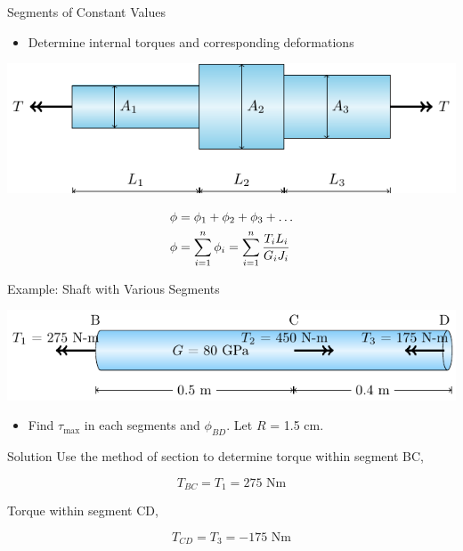 \documentclass[10pt, svgnames]{beamer}
\begin{document}
\begin{frame}[label={sec:org815ceec}]{Segments of Constant Values}
\begin{itemize}
\item Determine internal torques and corresponding deformations
\end{itemize}

\begin{center}
\includegraphics[width=.9\linewidth]{pictures/segments-constant-values.pdf}
\end{center}

\begin{gather*}
  \phi  = {\phi _1} + {\phi _2} + {\phi _3} +  \ldots  \hfill \\
  \phi  = \sum\limits_{i = 1}^n {{\phi _i} = \sum\limits_{i = 1}^n \dfrac{T_iL_i}{G_i J_i} }  \hfill \\
\end{gather*}
\end{frame}

\begin{frame}[label={sec:orgdd4ff51}]{Example: Shaft with Various Segments}
\begin{center}
\includegraphics[width=.9\linewidth]{pictures/segments-example.pdf}
\end{center}

\begin{itemize}
\item Find \(\tau_{\max}\) in each segments and \(\phi_{BD}\). Let \(R\) =
1.5 cm.
\end{itemize}
\end{frame}

\begin{frame}[label={sec:org30dac8a}]{Solution}
Use the method of section to determine torque within segment BC,

\[T_{BC} =  T_1 =  275\text{ Nm}\]

Torque within segment CD,

\[T_{CD} =  T_3 = -175\text{ Nm}\]
\end{frame}
\end{document}
